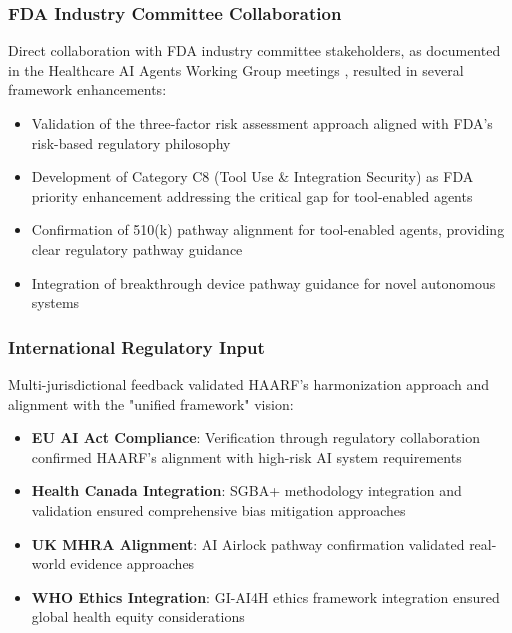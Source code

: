 \documentclass[11pt]{article}
\begin{document}
\subsubsection{FDA Industry Committee Collaboration}

Direct collaboration with FDA industry committee stakeholders, as documented in the Healthcare AI Agents Working Group meetings \cite{haarf2025repo}, resulted in several framework enhancements:

\begin{itemize}
    \item Validation of the three-factor risk assessment approach aligned with FDA's risk-based regulatory philosophy
    \item Development of Category C8 (Tool Use \& Integration Security) as FDA priority enhancement addressing the critical gap for tool-enabled agents
    \item Confirmation of 510(k) pathway alignment for tool-enabled agents, providing clear regulatory pathway guidance
    \item Integration of breakthrough device pathway guidance for novel autonomous systems
\end{itemize}

\subsubsection{International Regulatory Input}

Multi-jurisdictional feedback validated HAARF's harmonization approach and alignment with the "unified framework" vision:

\begin{itemize}
    \item \textbf{EU AI Act Compliance}: Verification through regulatory collaboration confirmed HAARF's alignment with high-risk AI system requirements \cite{eu2024aiact}
    \item \textbf{Health Canada Integration}: SGBA+ methodology integration and validation ensured comprehensive bias mitigation approaches \cite{healthcanada2021sgba}
    \item \textbf{UK MHRA Alignment}: AI Airlock pathway confirmation validated real-world evidence approaches \cite{mhra2023aiairlock}
    \item \textbf{WHO Ethics Integration}: GI-AI4H ethics framework integration ensured global health equity considerations \cite{who2021ethics}
\end{itemize}
\end{document}
